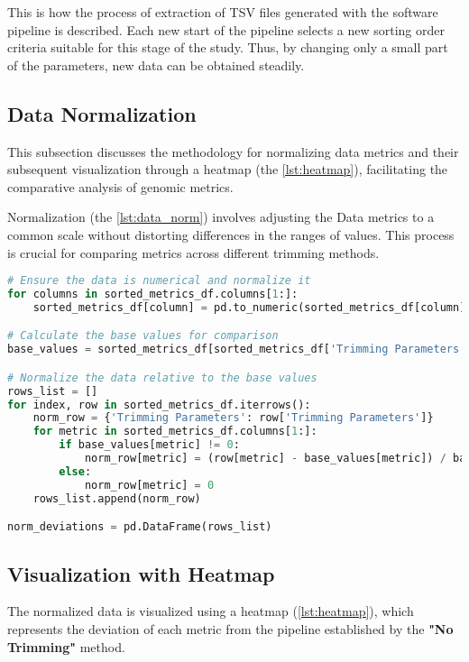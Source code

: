 This is how the process of extraction of TSV files generated with the software pipeline is described. Each new start of the pipeline selects a new sorting order criteria suitable for this stage of the study. Thus, by changing only a small part of the parameters, new data can be obtained steadily.

\subsection{Data Normalization}\label{sec:data_normalization}
This subsection discusses the methodology for normalizing data metrics and their subsequent visualization through a \gls{heatmap} (the \autoref{lst:heatmap}), facilitating the comparative analysis of genomic \gls{metrics}.

Normalization (the \autoref{lst:data_norm}) involves adjusting the Data \gls{metrics} to a common scale without distorting differences in the ranges of values. This process is crucial for comparing \gls{metrics} across different \gls{trimming} methods.

\begin{lstlisting}[language=Python, label={lst:data_norm}, caption=Data Normalization Process]
# Ensure the data is numerical and normalize it
for columns in sorted_metrics_df.columns[1:]:
    sorted_metrics_df[column] = pd.to_numeric(sorted_metrics_df[column], errors='coerce')

# Calculate the base values for comparison
base_values = sorted_metrics_df[sorted_metrics_df['Trimming Parameters'] == 'NoTrimming'].iloc[0, 1:]

# Normalize the data relative to the base values
rows_list = []
for index, row in sorted_metrics_df.iterrows():
    norm_row = {'Trimming Parameters': row['Trimming Parameters']}
    for metric in sorted_metrics_df.columns[1:]:
        if base_values[metric] != 0:
            norm_row[metric] = (row[metric] - base_values[metric]) / base_values[metric]
        else:
            norm_row[metric] = 0
    rows_list.append(norm_row)

norm_deviations = pd.DataFrame(rows_list)
\end{lstlisting}

\subsection{Visualization with Heatmap}\label{sec:visualization_heatmap}
The normalized data is visualized using a \gls{heatmap} (\autoref{lst:heatmap}), which represents the \gls{deviation} of each metric from the pipeline established by the \textbf{"No Trimming"} method.

